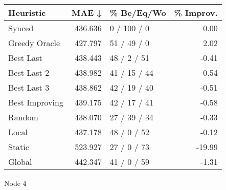 \begin{tabular}{lrlr}
\toprule
\textbf{Heuristic} & \textbf{MAE ↓} & \textbf{\% Be/Eq/Wo} & \textbf{\% Improv.} \\
\midrule
            Synced &        436.636 &          0 / 100 / 0 &                0.00 \\
     Greedy Oracle &        427.797 &          51 / 49 / 0 &                2.02 \\
         Best Last &        438.443 &          48 / 2 / 51 &               -0.41 \\
       Best Last 2 &        438.982 &         41 / 15 / 44 &               -0.54 \\
       Best Last 3 &        438.862 &         42 / 19 / 40 &               -0.51 \\
    Best Improving &        439.175 &         42 / 17 / 41 &               -0.58 \\
            Random &        438.070 &         27 / 39 / 34 &               -0.33 \\
             Local &        437.178 &          48 / 0 / 52 &               -0.12 \\
            Static &        523.927 &          27 / 0 / 73 &              -19.99 \\
            Global &        442.347 &          41 / 0 / 59 &               -1.31 \\
\bottomrule
\end{tabular}
\caption{Node 4}
\label{tab:iid_lr05_le2_bs2_4}
